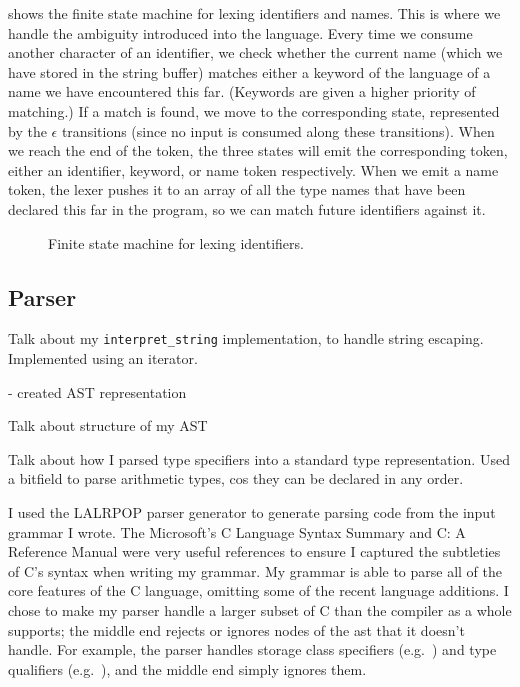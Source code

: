 \documentclass[00-main.tex]{subfiles}
\begin{document}
 shows the finite state machine for lexing identifiers and  names.
This is where we handle the ambiguity introduced into the language.
  Every time we consume another character of an identifier, we check whether the current name (which we have stored in the string buffer) matches either a keyword of the language of a  name we have encountered this far.
(Keywords are given a higher priority of matching.)
  If a match is found, we move to the corresponding state, represented by the $\epsilon$ transitions (since no input is consumed along these transitions).
When we reach the end of the token, the three states will emit the corresponding token, either an identifier, keyword, or  name token respectively.
When we emit a  name token, the lexer pushes it to an array of all the type names that have been declared this far in the program, so we can match future identifiers against it.

\begin{figure}[ht]
  \centering
  \caption{Finite state machine for lexing identifiers.}
  \label{fig:lexing identifiers fsm}
\end{figure}


\subsection{Parser}

\begin{mrwComment}
Talk about my \texttt{interpret\_string} implementation, to handle string escaping. Implemented using an iterator.

- created AST representation

Talk about structure of my AST

Talk about how I parsed type specifiers into a standard type representation. Used a bitfield to parse arithmetic types, cos they can be declared in any order.
\end{mrwComment}

I used the LALRPOP parser generator  to generate parsing code from the input grammar I wrote.
The Microsoft's C Language Syntax Summary  and C: A Reference Manual  were very useful references to ensure I captured the subtleties of C's syntax when writing my grammar.
My grammar is able to parse all of the core features of the C language, omitting some of the recent language additions. I chose to make my parser handle a larger subset of C than the compiler as a whole supports; the middle end rejects or ignores nodes of the \gls{ast} that it doesn't handle. For example, the parser handles storage class specifiers (e.g.\ ) and type qualifiers (e.g.\ ), and the middle end simply ignores them.
\end{document}
